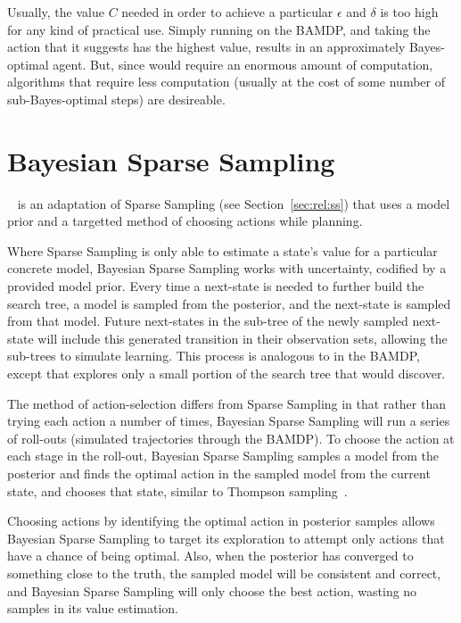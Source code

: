 Usually, the value $C$ needed in order to achieve a particular $\epsilon$ and $\delta$ is too high for any kind of practical use. Simply running  on the BAMDP, and taking the action that it suggests has the highest value, results in an approximately Bayes-optimal agent. But, since  would require an enormous amount of computation, algorithms that require less computation (usually at the cost of some number of sub-Bayes-optimal steps) are desireable.

\section{Bayesian Sparse Sampling}

~\cite{wang05} is an adaptation of Sparse Sampling (see Section~\ref{sec:rel:ss}) that uses a model prior and a targetted method of choosing actions while planning.

Where Sparse Sampling is only able to estimate a state's value for a particular concrete model, Bayesian Sparse Sampling works with uncertainty, codified by a provided model prior. Every time a next-state is needed to further build the search tree, a model is sampled from the posterior, and the next-state is sampled from that model. Future next-states in the sub-tree of the newly sampled next-state will include this generated transition in their observation sets, allowing the sub-trees to simulate learning. This process is analogous to  in the BAMDP, except that  explores only a small portion of the search tree that  would discover. 

The method of action-selection differs from Sparse Sampling in that rather than trying each action a number of times, Bayesian Sparse Sampling will run a series of roll-outs (simulated trajectories through the BAMDP). To choose the action at each stage in the roll-out, Bayesian Sparse Sampling samples a model from the posterior and finds the optimal action in the sampled model from the current state, and chooses that state, similar to Thompson sampling~\cite{thompson33}.


Choosing actions by identifying the optimal action in posterior samples allows Bayesian Sparse Sampling to target its exploration to attempt only actions that have a chance of being optimal. Also, when the posterior has converged to something close to the truth, the sampled model will be consistent and correct, and Bayesian Sparse Sampling will only choose the best action, wasting no samples in its value estimation.

